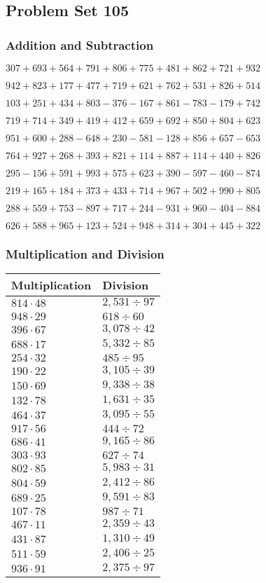 \hypertarget{problem-set-105}{%
\subsection{Problem Set 105}\label{problem-set-105}}

\hypertarget{addition-and-subtraction}{%
\subsubsection{Addition and
Subtraction}\label{addition-and-subtraction}}

\(307 +693 +564 +791 +806 +775 +481 +862 +721 +932\)

\(942 +823 +177 +477 +719 +621 +762 +531 +826 +514\)

\(103 +251 +434 +803 - 376 - 167 +861 - 783 - 179 +742\)

\(719 +714 +349 +419 +412 +659 +692 +850 +804 +623\)

\(951 +600 +288 - 648 +230 - 581 - 128 +856 +657 - 653\)

\(764 +927 +268 +393 +821 +114 +887 +114 +440 +826\)

\(295 - 156 +591 +993 +575 +623 +390 - 597 - 460 - 874\)

\(219 +165 +184 +373 +433 +714 +967 +502 +990 +805\)

\(288 +559 +753 - 897 +717 +244 - 931 +960 - 404 - 884\)

\(626 +588 +965 +123 +524 +948 +314 +304 +445 +322\)

\hypertarget{multiplication-and-division}{%
\subsubsection{Multiplication and
Division}\label{multiplication-and-division}}

\begin{longtable}[]{@{}ll@{}}
\toprule
Multiplication & Division\tabularnewline
\midrule
\endhead
\(814 \cdot 48\) & \(2,531÷97\)\tabularnewline
\(948 \cdot 29\) & \(618÷60\)\tabularnewline
\(396 \cdot 67\) & \(3,078÷42\)\tabularnewline
\(688 \cdot 17\) & \(5,332÷85\)\tabularnewline
\(254 \cdot 32\) & \(485÷95\)\tabularnewline
\(190 \cdot 22\) & \(3,105÷39\)\tabularnewline
\(150 \cdot 69\) & \(9,338÷38\)\tabularnewline
\(132 \cdot 78\) & \(1,631÷35\)\tabularnewline
\(464 \cdot 37\) & \(3,095÷55\)\tabularnewline
\(917 \cdot 56\) & \(444÷72\)\tabularnewline
\(686 \cdot 41\) & \(9,165÷86\)\tabularnewline
\(303 \cdot 93\) & \(627÷74\)\tabularnewline
\(802 \cdot 85\) & \(5,983÷31\)\tabularnewline
\(804 \cdot 59\) & \(2,412÷86\)\tabularnewline
\(689 \cdot 25\) & \(9,591÷83\)\tabularnewline
\(107 \cdot 78\) & \(987÷71\)\tabularnewline
\(467 \cdot 11\) & \(2,359÷43\)\tabularnewline
\(431 \cdot 87\) & \(1,310÷49\)\tabularnewline
\(511 \cdot 59\) & \(2,406÷25\)\tabularnewline
\(936 \cdot 91\) & \(2,375÷97\)\tabularnewline
\bottomrule
\end{longtable}

